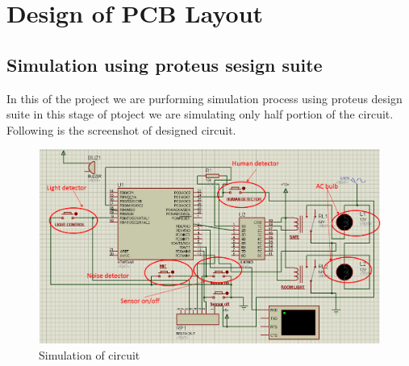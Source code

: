 \documentclass[twoside,a4paper,16pt]{book}
\begin{document}
{\chapter{Design of PCB Layout }
\section{Simulation using proteus sesign suite}
In this of the project we are purforming simulation process using proteus design suite in this stage of ptoject we are simulating only half portion of the circuit.
Following is the screenshot of designed circuit.
\begin{figure}[ht!]
	\begin{center}
		\includegraphics[width=17.0cm]{f4.png}
		\caption{Simulation of circuit}
	\end{center}
\end{figure}
\newpage
}
\end{document}
